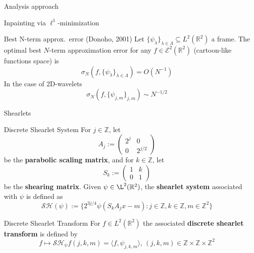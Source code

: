 \begin{frame}{Analysis approach}
\begin{block}{}
\begin{algorithm2e}[H]

    \caption{Inpainting via $\ell^1$-minimization}
\end{algorithm2e}
\end{block}

\pause

\begin{block}{Best N-term approx.\ error (Donoho, 2001)}
Let $\{\psi_{\lambda}\}_{\lambda\in\Lambda}\subseteq L^2(\mathbb{R}^2)$ a frame. The optimal best $N$-term approximation error for any $f\in \mathcal{E}^2(\mathbb{R}^2)$ (cartoon-like functions space) is 
$$
\sigma_N(f,\{\psi_{\lambda}\}_{\lambda\in\Lambda})=O(N^{-1})
$$
In the case of 2D-wavelets
$$
\sigma_{N}(f,\{\psi_{j,m}\}_{j,m})\sim N^{-1/2}
$$
\end{block}
\end{frame}

\begin{frame}{Shearlets}
\begin{block}{Discrete Shearlet System}
For $j\in\mathbb{Z}$, let 
$$
A_j:=\left(\begin{matrix} 2^j & 0 \\ 0 & 2^{j/2} \end{matrix}\right)
$$
be the \textbf{parabolic scaling matrix}, and for $k\in\mathbb{Z}$, let 
$$
S_k:=\left(\begin{matrix} 1 & k \\ 0 & 1\end{matrix}\right)
$$
be the \textbf{shearing matrix}. Given $\psi\in\L^2(\mathbb{R}^2)$, the \textbf{shearlet system} associated with $\psi$ is defined as 
$$
\mathcal{SH}(\psi):=\{ 2^{3j/4}\psi(S_kA_jx-m) : j\in \mathbb{Z},k\in\mathbb{Z},m\in\mathbb{Z}^2\}
$$
\end{block}
\pause
\begin{block}{Discrete Shearlet Transform}
For $f\in L^2(\mathbb{R}^2)$ the associated \textbf{discrete shearlet transform} is defined by 
$$
f\mapsto \mathcal{SH}_{\psi}f(j,k,m)=\langle f,\psi_{j,k,m}\rangle\text{,  }(j,k,m)\in\mathbb{Z}\times\mathbb{Z}\times\mathbb{Z}^2
$$
\end{block}
\end{frame}


